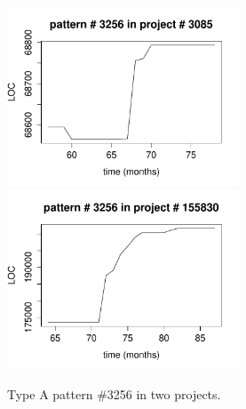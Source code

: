 \begin{figure}[H]
\caption{Type A pattern \#3256 in two projects.}\label{figure:type_a_pattern}
\centering
	\includegraphics[width=196pt]{images/pattern_a_3085.pdf}
	\hspace{1em}
	\includegraphics[width=196pt]{images/pattern_a_155830.pdf}
\end{figure}